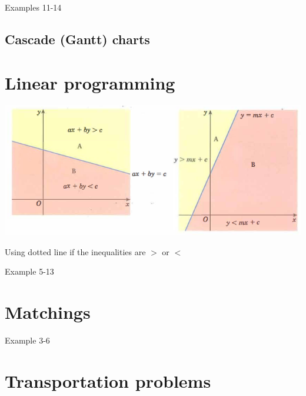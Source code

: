 \documentclass[a4paper]{article}
\begin{document}
\begin{eg}
	Examples 11-14
\end{eg}

\subsection{Cascade (Gantt) charts}


\section{Linear programming}
\begin{center}
	\includegraphics[scale=0.5]{img_D/6_intro}
\end{center}
\begin{remark}
	Using dotted line if the inequalities are $>$ or $<$
\end{remark}
\begin{eg}
	Example 5-13
\end{eg}


\section{Matchings}

\begin{eg}
	Example 3-6
\end{eg}

\section{Transportation problems}
\end{document}

